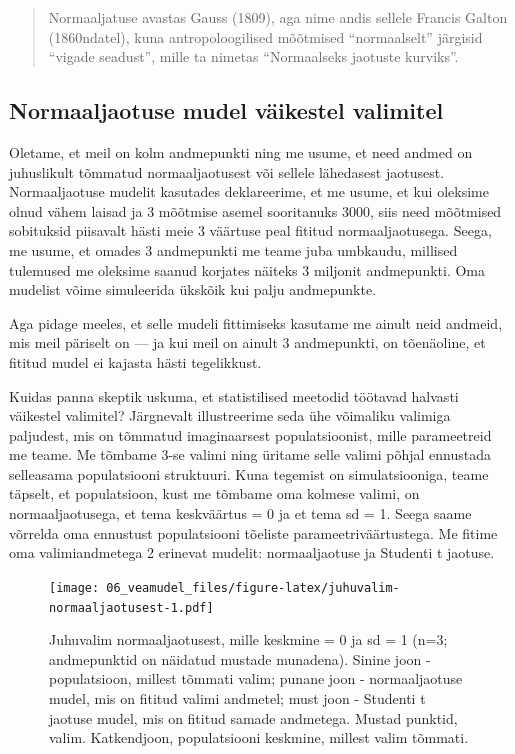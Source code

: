 \documentclass[]{book}
\begin{document}
\begin{quote}
Normaaljatuse avastas Gauss (1809), aga nime andis sellele Francis
Galton (1860ndatel), kuna antropoloogilised mõõtmised ``normaalselt''
järgisid ``vigade seadust'', mille ta nimetas ``Normaalseks jaotuste
kurviks''.
\end{quote}

\subsection*{Normaaljaotuse mudel väikestel
valimitel}\label{normaaljaotuse-mudel-vaikestel-valimitel}

Oletame, et meil on kolm andmepunkti ning me usume, et need andmed on
juhuslikult tõmmatud normaaljaotusest või sellele lähedasest jaotusest.
Normaaljaotuse mudelit kasutades deklareerime, et me usume, et kui
oleksime olnud vähem laisad ja 3 mõõtmise asemel sooritanuks 3000, siis
need mõõtmised sobituksid piisavalt hästi meie 3 väärtuse peal fititud
normaaljaotusega. Seega, me usume, et omades 3 andmepunkti me teame juba
umbkaudu, millised tulemused me oleksime saanud korjates näiteks 3
miljonit andmepunkti. Oma mudelist võime simuleerida ükskõik kui palju
andmepunkte.

Aga pidage meeles, et selle mudeli fittimiseks kasutame me ainult neid
andmeid, mis meil päriselt on --- ja kui meil on ainult 3 andmepunkti,
on tõenäoline, et fititud mudel ei kajasta hästi tegelikkust.

Kuidas panna skeptik uskuma, et statistilised meetodid töötavad halvasti
väikestel valimitel? Järgnevalt illustreerime seda ühe võimaliku
valimiga paljudest, mis on tõmmatud imaginaarsest populatsioonist, mille
parameetreid me teame. Me tõmbame 3-se valimi ning üritame selle valimi
põhjal ennustada selleasama populatsiooni struktuuri. Kuna tegemist on
simulatsiooniga, teame täpselt, et populatsioon, kust me tõmbame oma
kolmese valimi, on normaaljaotusega, et tema keskväärtus = 0 ja et tema
sd = 1. Seega saame võrrelda oma ennustust populatsiooni tõeliste
parameetriväärtustega. Me fitime oma valimiandmetega 2 erinevat mudelit:
normaaljaotuse ja Studenti t jaotuse.









\begin{figure}
\centering
\texttt{[image: 06\_veamudel\_files/figure-latex/juhuvalim-normaaljaotusest-1.pdf]}
\caption{\label{fig:juhuvalim-normaaljaotusest}Juhuvalim normaaljaotusest, mille
keskmine = 0 ja sd = 1 (n=3; andmepunktid on näidatud mustade munadena).
Sinine joon - populatsioon, millest tõmmati valim; punane joon -
normaaljaotuse mudel, mis on fititud valimi andmetel; must joon -
Studenti t jaotuse mudel, mis on fititud samade andmetega. Mustad
punktid, valim. Katkendjoon, populatsiooni keskmine, millest valim
tõmmati.}
\end{figure}
\end{document}
